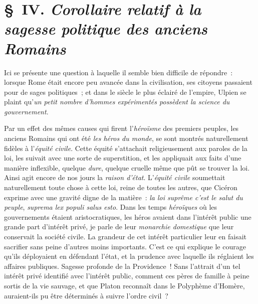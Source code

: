 \documentclass[french,twoside]{book} %
\begin{document}
\section[{§ IV. Corollaire relatif à la sagesse politique des anciens Romains}]{§ IV. {\itshape Corollaire relatif à la sagesse politique des anciens Romains}}
\noindent Ici se présente une question à laquelle il semble bien difficile de répondre : lorsque Rome était encore peu avancée dans la civilisation, ses citoyens passaient pour de sages politiques ; et dans le siècle le plus éclairé de l’empire, Ulpien se plaint qu’\emph{{\itshape un petit nombre d’hommes expérimentés possèdent la science du gouvernement}}.\par
Par un effet des mêmes causes qui firent l’{\itshape héroïsme} des premiers peuples, les anciens Romains qui ont été {\itshape les héros du monde}, se sont montrés naturellement fidèles à l’{\itshape équité civile}. Cette équité s’attachait religieusement aux paroles de la loi, les  suivait avec une sorte de superstition, et les appliquait aux faits d’une manière inflexible, quelque {\itshape dure}, quelque cruelle même que pût se trouver la loi. Ainsi agit encore de nos jours la {\itshape raison d’état}. L’{\itshape équité civile} soumettait naturellement toute chose à cette loi, reine de toutes les autres, que Cicéron exprime avec une gravité digne de la matière : \emph{{\itshape la loi suprême c’est le salut du peuple}}, \emph{{\itshape suprema lex populi salus esto}}. Dans les temps {\itshape héroïques} où les gouvernements étaient aristocratiques, les héros avaient dans l’intérêt public une grande part d’intérêt privé, je parle de leur {\itshape monarchie domestique} que leur conservait la société civile. La grandeur de cet intérêt particulier leur en faisait sacrifier sans peine d’autres moins importants. C’est ce qui explique le courage qu’ils déployaient en défendant l’état, et la prudence avec laquelle ils réglaient les affaires publiques. Sagesse profonde de la Providence ! Sans l’attrait d’un tel intérêt privé identifié avec l’intérêt public, comment ces pères de famille à peine sortis de la vie sauvage, et que Platon reconnaît dans le Polyphème d’Homère, auraient-ils pu être déterminés à suivre l’ordre civil ?\par
\end{document}
